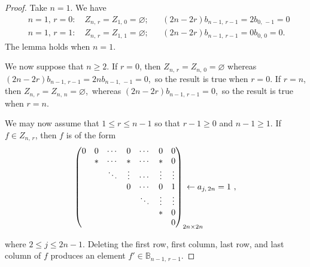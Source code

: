 \documentclass[11pt]{article}
\newcommand{\q}{\quad}
\newcommand{\ges}{\geqslant}
\newcommand{\les}{\leqslant}
\begin{document}
\begin{proof}
Take $n=1$. We have
\begin{align*}
&n=1,\,r=0:\q Z_{n,\,r}=Z_{1,\,0}=\varnothing;
&& (2n-2r)b_{n-1,\,r-1}=2b_{0,\,-1}=0\\
&n=1,\,r=1:\q Z_{n,\,r}=Z_{1,\,1}=\varnothing;&&
(2n-2r)b_{n-1,\,r-1}=0b_{0,\,0}=0.
\end{align*} 
The lemma holds when $n=1$.

We now suppose that $n\ges 2$. If $r=0$, then 
$Z_{n,\,r}=Z_{n,\,0}=\varnothing$ whereas $(2n-2r)b_{n-1,\,r-1}=2nb_{n-1,\,-1}=0$,\, so the result is true when $r=0$.
If $r=n$, then  $Z_{n,\,r}=Z_{n,\,n}=\varnothing$,\, whereas 
$(2n-2r)b_{n-1,\,r-1}=0$,\, so the result is true when $r=n$. 

We may now assume that $1\les r\les n-1$ so that $r-1\ges 0$ and $n-1\ges 1$.
If $f\in Z_{n,\,r}$, then $f$ is of the form
\[
\begin{array}{l@{}l}
\begin{pmatrix}
            0 & 0 & \cdots & 0&\cdots & 0& 0 \\
              & * & \cdots & *&\cdots & *& 0 \\
              &   & \ddots &\vdots&\cdots & \vdots& \vdots \\
              &   &        &0 & \cdots& 0& 1 \\
              &   &        &  &\ddots &\vdots&\vdots \\
              &   &        &  &       & *& 0  \\
              &   &        &  &       &  & 0  \\
             \end{pmatrix}_{2n \times 2n}  
   & \hspace{-2em}{\leftarrow\;}{\scriptsize a_{j,\,2n}=1}~,
   \end{array}
\]

where $2\les j\les 2n-1$. Deleting the first row, first column, last row, and last column of $f$ produces an element $f'\in\mathbb B_{n-1,\,r-1}$. 


\end{proof}
\end{document}
